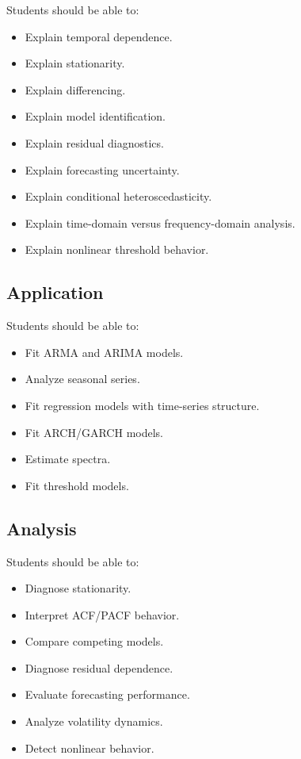 \documentclass[11pt,a4paper]{article}
\begin{document}
Students should be able to:

\begin{itemize}
    \item Explain temporal dependence.
    \item Explain stationarity.
    \item Explain differencing.
    \item Explain model identification.
    \item Explain residual diagnostics.
    \item Explain forecasting uncertainty.
    \item Explain conditional heteroscedasticity.
    \item Explain time-domain versus frequency-domain analysis.
    \item Explain nonlinear threshold behavior.
\end{itemize}

\subsection{Application}

Students should be able to:

\begin{itemize}
    \item Fit ARMA and ARIMA models.
    \item Analyze seasonal series.
    \item Fit regression models with time-series structure.
    \item Fit ARCH/GARCH models.
    \item Estimate spectra.
    \item Fit threshold models.
\end{itemize}

\subsection{Analysis}

Students should be able to:

\begin{itemize}
    \item Diagnose stationarity.
    \item Interpret ACF/PACF behavior.
    \item Compare competing models.
    \item Diagnose residual dependence.
    \item Evaluate forecasting performance.
    \item Analyze volatility dynamics.
    \item Detect nonlinear behavior.
\end{itemize}
\end{document}
